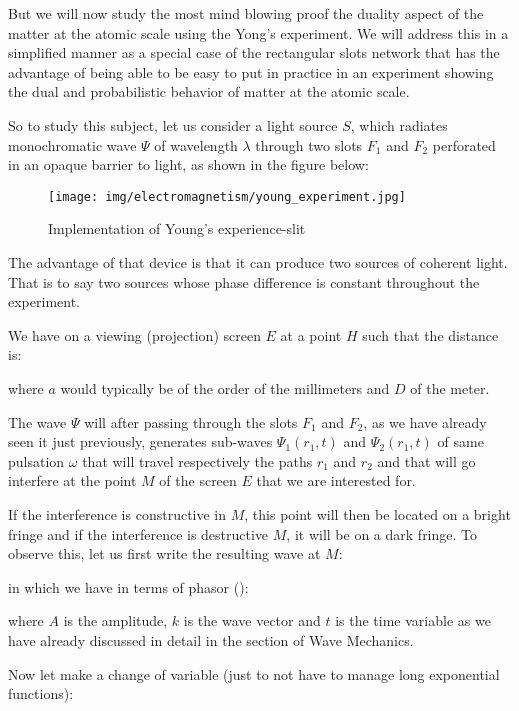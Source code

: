 	But we will now study the most mind blowing proof the duality aspect of the matter at the atomic scale using the Yong's experiment. We will address this in a simplified manner as a special case of the rectangular slots network that has the advantage of being able to be easy to put in practice in an experiment showing the dual and probabilistic behavior of matter at the atomic scale.

	So to study this subject, let us consider a light source $S$, which radiates monochromatic wave $\Psi$ of wavelength $\lambda$ through two slots $F_1$ and $F_2$ perforated  in an opaque barrier to light, as shown in the figure below:
	\begin{figure}[H]
		\centering
		\texttt{[image: img/electromagnetism/young\_experiment.jpg]}
		\caption{Implementation of Young's experience-slit}
	\end{figure}
	
	\begin{tcolorbox}[title=Remark,colframe=black,arc=10pt]
	The advantage of that device is that it can produce two sources of coherent light. That is to say two sources whose phase difference is constant throughout the experiment.
	\end{tcolorbox}
	We have on a viewing (projection) screen $E$ at a point $H$ such that the distance is:
	
	where $a$ would typically be of the order of the millimeters and $D$ of the meter.
	
	The wave $\Psi$ will after passing through the slots $F_1$ and $F_2$, as we have already seen it just previously, generates sub-waves $\Psi_1(r_1,t)$ and $\Psi_2(r_1,t)$ of same pulsation $\omega$ that will travel respectively the paths $r_1$ and $r_2$ and that will go interfere at the point $M$ of the screen $E$ that we are interested for.
	
	If the interference is constructive in $M$, this point will then be located on a bright fringe and if the interference is destructive $M$, it will be on a dark fringe. To observe this, let us first write the resulting wave at $M$:
	
	in which we have in terms of phasor ():
	
	where $A$ is the amplitude, $k$ is the wave vector and $t$ is the time variable as we have already discussed in detail in the section of Wave Mechanics.

	Now let make a change of variable (just to not have to manage long exponential functions):
	
